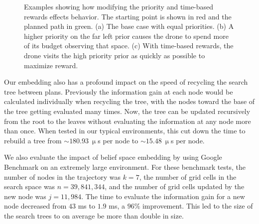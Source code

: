 \begin{figure}[t]
    \begin{subfigure}[b]{0.99\columnwidth}
        \centering
        \caption{}
        \label{fig:priority_time_impactc}
    \end{subfigure}

    
    \caption{Examples showing how modifying the priority and time-based rewards effects behavior. The starting point is shown in red and the planned path in green. (a) The base case with equal priorities. (b) A higher priority on the far left prior causes the drone to spend more of its budget observing that space. (c) With time-based rewards, the drone visits the high priority prior as quickly as possible to maximize reward.}
    \label{fig:priority_time_impact}
\end{figure}

Our embedding also has a profound impact on the speed of recycling the search tree between plans. 
Previously the information gain at each node would be calculated individually when recycling the tree, with the nodes toward the base of the tree getting evaluated many times. 
Now, the tree can be updated recursively from the root to the leaves without evaluating the information at any node more than once. 
When tested in our typical environments, this cut down the time to rebuild a tree from 
${\sim}180.93~\upmu$s per node
to ${\sim}15.48~\upmu$s per node. 


We also evaluate the impact of belief space embedding by using Google Benchmark \cite{gtest} on an extremely large environment. For these benchmark tests, the number of nodes in the trajectory was $k = 7$, the number of grid cells in the search space was $n=39,841,344$, and the number of grid cells updated by the new node was $j=11,984$. The time to evaluate the information gain for a new node decreased from $43$ ms to $1.9$ ms, a $96\%$ improvement. This led to the size of the search trees to on average be more than double in size. 






